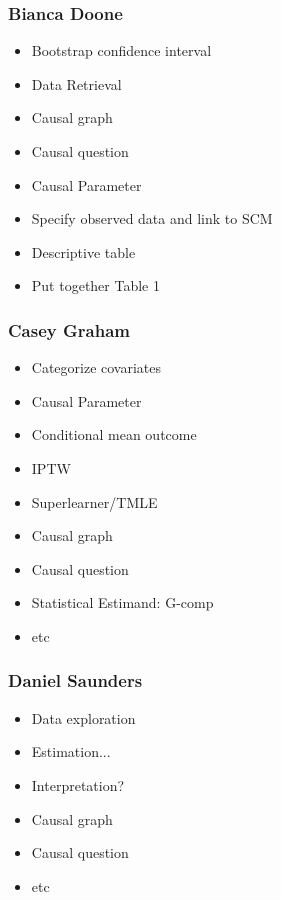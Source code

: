 \documentclass[]{article}
\begin{document}
\subsubsection{Bianca Doone}\label{bianca-doone}

\begin{itemize}

\item Bootstrap confidence interval
\item Data Retrieval 
\item Causal graph
\item Causal question
\item Causal Parameter
\item Specify observed data and link to SCM
\item Descriptive table
\item Put together Table 1

\end{itemize}

\subsubsection{Casey Graham}\label{casey-graham}

\begin{itemize}
\item  Categorize covariates 
\item  Causal Parameter
\item  Conditional mean outcome
\item  IPTW
\item  Superlearner/TMLE
\item  Causal graph
\item  Causal question
\item  Statistical Estimand: G-comp
\item  etc

\end{itemize}

\subsubsection{Daniel Saunders}\label{daniel-saunders}

\begin{itemize}
\item  Data exploration
\item  Estimation...
\item  Interpretation?
\item  Causal graph
\item  Causal question
\item  etc

\end{itemize}
\end{document}
